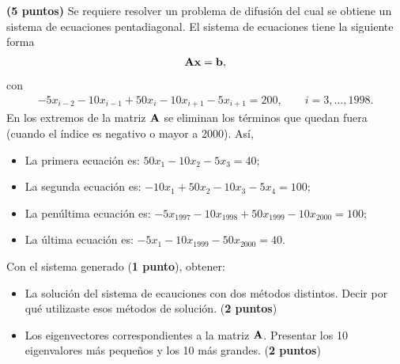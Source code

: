 \begin{problem}
\textbf{(5 puntos)}\hfill
Se requiere resolver un problema de difusi\'on del cual se obtiene un sistema de ecuaciones pentadiagonal. El sistema de ecuaciones tiene la siguiente forma
\begin{align*}
	\mathbf{Ax} = \mathbf{b},
\end{align*}
con
\begin{align*}
	-5x_{i-2} - 10x_{i-1} + 50x_{i} - 10x_{i+1} - 5x_{i+1} = 200,\qquad i = 3,\dots,1998.
\end{align*}
En los extremos de la matriz $ \mathbf{A} $ se eliminan los t\'erminos que quedan fuera (cuando el \'indice es negativo o mayor a 2000). As\'i,
\begin{itemize}
	\item La primera ecuaci\'on es: $ 50x_1 - 10x_2 - 5x_3 = 40 $;
	\item La segunda ecuaci\'on es: $ -10x_1 + 50x_2 - 10x_3 - 5x_4 = 100 $;
	\item La pen\'ultima ecuaci\'on es: $ -5x_{1997} - 10x_{1998} + 50x_{1999} - 10x_{2000} = 100 $;
	\item La \'ultima ecuaci\'on es: $ -5x_1 - 10x_{1999} - 50x_{2000} = 40 $.
\end{itemize}
Con el sistema generado (\textbf{1 punto}), obtener:
\begin{itemize}
	\item La soluci\'on del sistema de ecauciones con dos m\'etodos distintos.
	      Decir por qu\'e utilizaste esos m\'etodos de soluci\'on. (\textbf{2
		      puntos})
	\item Los eigenvectores correspondientes a la matriz $ \mathbf{A} $. Presentar
	      los 10 eigenvalores m\'as peque\~nos y los 10 m\'as grandes. (\textbf{2
		      puntos})
\end{itemize}
\end{problem}

